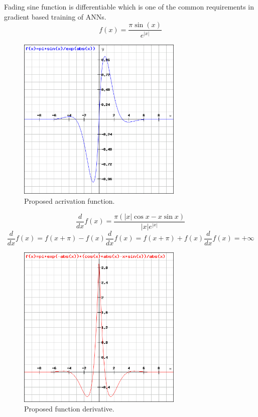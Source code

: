 \documentclass{llncs}
\begin{document}
Fading sine function is differentiable which is one of the common requirements in gradient based training of ANNs.
%
\begin{equation}
f(x) = \frac {\pi \sin(x)} { e^{ |x| }}
\end{equation}
%
\begin{figure}
	\centering
	\includegraphics[width=7.88cm,height=7.88cm]{fig03.png}
	\caption{Proposed acrivation function.}
	\label{fig:Graph}
\end{figure}
\FloatBarrier
%
\begin{equation}
\frac{d}{dx}f(x) = \frac {\pi (|x|\cos x - x\sin x)} { |x| e^{ |x| } }
\end{equation}
%
\begin{equation}
\frac{d}{dx}f(x) = f(x + \pi) - f(x)
\frac{d}{dx}f(x) = f(x + \pi) + f(x)
\frac{d}{dx}f(x) = +\infty
\end{equation}
%
\begin{figure}
	\centering
	\includegraphics[width=7.88cm,height=7.88cm]{fig04.png}
	\caption{Proposed function derivative.}
	\label{fig:Graph}
\end{figure}
\FloatBarrier
%
\end{document}
